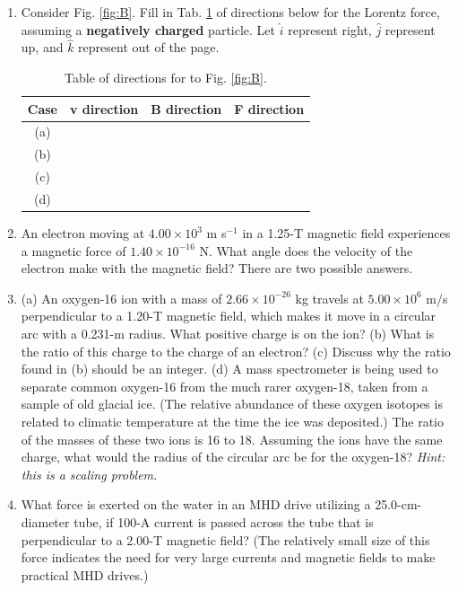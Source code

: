 \documentclass[12pt,twocolumn]{article}
\begin{document}
\noindent
\begin{enumerate}
\item Consider Fig. \ref{fig:B}. Fill in Tab. \ref{tab:ex} of directions below for the Lorentz force, assuming a \textbf{negatively charged} particle.  Let $\hat{i}$ represent right, $\hat{j}$ represent up, and $\hat{k}$ represent out of the page.
\begin{table}
\centering
\begin{tabular}{| c | c | c | c |}
\hline
Case & v direction & B direction & F direction \\ \hline
(a) & & & \\ \hline
(b) & & & \\ \hline
(c) & & & \\ \hline
(d) & & & \\ \hline
\end{tabular}
\caption{\label{tab:ex} Table of directions for to Fig. \ref{fig:B}.}
\end{table}
\item An electron moving at $4.00\times 10^3$ m s$^{-1}$ in a 1.25-T magnetic field experiences a magnetic force of $1.40\times 10^{-16}$ N. What angle does the velocity of the electron make with the magnetic field? There are two possible answers. \\ \vspace{5cm}
\item (a) An oxygen-16 ion with a mass of $2.66\times 10^{-26}$ kg travels at $5.00\times 10^6$ m/s perpendicular to a 1.20-T magnetic field, which makes it move in a circular arc with a 0.231-m radius. What positive charge is on the ion? (b) What is the ratio of this charge to the charge of an electron? (c) Discuss why the ratio found in (b) should be an integer. (d) A mass spectrometer is being used to separate common oxygen-16 from the much rarer oxygen-18, taken from a sample of old glacial ice. (The relative abundance of these oxygen isotopes is related to climatic temperature at the time the ice was deposited.) The ratio of the masses of these two ions is 16 to 18.  Assuming the ions have the same charge, what would the radius of the circular arc be for the oxygen-18?  \textit{Hint: this is a scaling problem.} \\ \vspace{6cm}
\item What force is exerted on the water in an MHD drive utilizing a 25.0-cm-diameter tube, if 100-A current is passed across the tube that is perpendicular to a 2.00-T magnetic field? (The relatively small size of this force indicates the need for very large currents and magnetic fields to make practical MHD drives.) \\ \vspace{3cm}

\end{enumerate}
\end{document}
